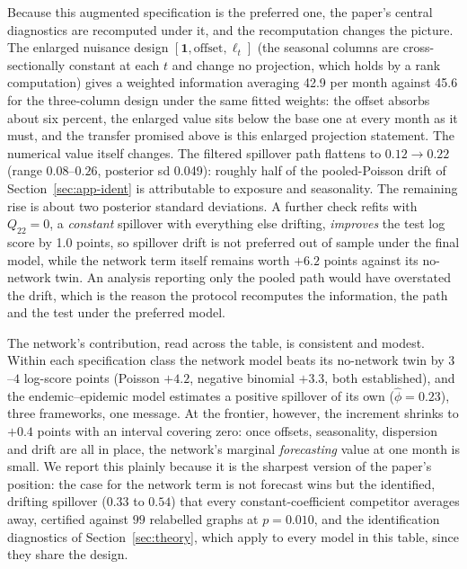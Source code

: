 \documentclass[12pt]{article}
\theoremstyle{plain}
\theoremstyle{definition}
\theoremstyle{remark}
\newcommand{\one}{\mathbf{1}}
\newcommand{\InfoFinalEnl}{42.9}
\newcommand{\InfoFinalBase}{45.6}
\newcommand{\FinalBOneFirst}{0.12}
\newcommand{\FinalBOneLast}{0.22}
\newcommand{\FinalBOneLo}{0.08}
\newcommand{\FinalBOneHi}{0.26}
\newcommand{\FinalSd}{0.049}
\newcommand{\DeltaNetFinal}{6.2}
\newcommand{\DeltaDriftFinal}{1.0}
\begin{document}
Because this augmented specification is the preferred one, the paper's central diagnostics are recomputed under it, and the recomputation changes the picture. The enlarged nuisance design $[\one,\text{offset},\ell_t]$ (the seasonal columns are cross-sectionally constant at each $t$ and change no projection, which holds by a rank computation) gives a weighted information averaging \InfoFinalEnl{} per month against \InfoFinalBase{} for the three-column design under the same fitted weights: the offset absorbs about six percent, the enlarged value sits below the base one at every month as it must, and the transfer promised above is this enlarged projection statement. The numerical value itself changes. The filtered spillover path flattens to $\FinalBOneFirst\to\FinalBOneLast$ (range $\FinalBOneLo$--$\FinalBOneHi$, posterior sd \FinalSd): roughly half of the pooled-Poisson drift of Section~\ref{sec:app-ident} is attributable to exposure and seasonality. The remaining rise is about two posterior standard deviations. A further check refits with $Q_{22}=0$, a \emph{constant} spillover with everything else drifting, \emph{improves} the test log score by \DeltaDriftFinal{} points, so spillover drift is not preferred out of sample under the final model, while the network term itself remains worth $+\DeltaNetFinal$ points against its no-network twin. An analysis reporting only the pooled path would have overstated the drift, which is the reason the protocol recomputes the information, the path and the test under the preferred model.

The network's contribution, read across the table, is consistent and modest. Within each specification class the network model beats its no-network twin by $3$--$4$ log-score points (Poisson $+4.2$, negative binomial $+3.3$, both established), and the endemic--epidemic model estimates a positive spillover of its own ($\hat\phi=0.23$), three frameworks, one message. At the frontier, however, the increment shrinks to $+0.4$ points with an interval covering zero: once offsets, seasonality, dispersion and drift are all in place, the network's marginal \emph{forecasting} value at one month is small. We report this plainly because it is the sharpest version of the paper's position: the case for the network term is not forecast wins but the identified, drifting spillover ($0.33$ to $0.54$) that every constant-coefficient competitor averages away, certified against $99$ relabelled graphs at $p=0.010$, and the identification diagnostics of Section~\ref{sec:theory}, which apply to every model in this table, since they share the design.
\end{document}
